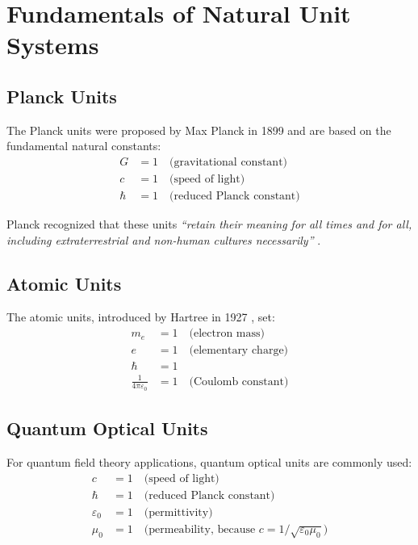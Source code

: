 \documentclass[11pt,a4paper]{article}
\begin{document}
	\section{Fundamentals of Natural Unit Systems}
	
	\subsection{Planck Units}
	
	The Planck units were proposed by Max Planck in 1899 \cite{planck1900,planck1906} and are based on the fundamental natural constants:
	\begin{align}
		G &= 1 \quad \text{(gravitational constant)} \\
		c &= 1 \quad \text{(speed of light)} \\
		\hbar &= 1 \quad \text{(reduced Planck constant)}
	\end{align}
	
	Planck recognized that these units \textit{``retain their meaning for all times and for all, including extraterrestrial and non-human cultures necessarily''} \cite{planck1900}.
	
	\subsection{Atomic Units}
	
	The atomic units, introduced by Hartree in 1927 \cite{hartree1957}, set:
	\begin{align}
		m_e &= 1 \quad \text{(electron mass)} \\
		e &= 1 \quad \text{(elementary charge)} \\
		\hbar &= 1 \\
		\frac{1}{4\pi\varepsilon_0} &= 1 \quad \text{(Coulomb constant)}
	\end{align}
	
	\subsection{Quantum Optical Units}
	
	For quantum field theory applications, quantum optical units are commonly used:
	\begin{align}
		c &= 1 \quad \text{(speed of light)} \\
		\hbar &= 1 \quad \text{(reduced Planck constant)} \\
		\varepsilon_0 &= 1 \quad \text{(permittivity)} \\
		\mu_0 &= 1 \quad \text{(permeability, because } c = 1/\sqrt{\varepsilon_0 \mu_0}\text{)}
	\end{align}
	
\end{document}
